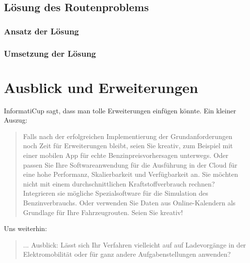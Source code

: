 \documentclass[11pt]{article}
\begin{document}
\subsection{Lösung des Routenproblems}
\subsubsection{Ansatz der Lösung}
\subsubsection{Umsetzung der Lösung}

\section{Ausblick und Erweiterungen}
	InformatiCup sagt, dass man tolle Erweiterungen einfügen könnte. Ein kleiner Auszug: 
	\begin{quote}
		Falls nach der erfolgreichen Implementierung der Grundanforderungen noch Zeit für Erweiterungen bleibt, seien Sie kreativ, zum Beispiel mit einer mobilen App für echte Benzinpreisvorhersagen unterwegs. Oder passen Sie Ihre Softwareanwendung für die Ausführung in der Cloud für eine hohe Performanz, Skalierbarkeit und Verfügbarkeit an. Sie möchten nicht mit einem durchschnittlichen Kraftstoffverbrauch rechnen? Integrieren sie mögliche Spezialsoftware für die Simulation des Benzinverbrauchs. Oder verwenden Sie Daten aus Online-Kalendern als Grundlage für Ihre Fahrzeugrouten. Seien Sie kreativ!
	\end{quote}
	Uns weiterhin:
	\begin{quote}
		... Ausblick: Lässt sich Ihr Verfahren vielleicht auf auf Ladevorgänge in der Elektromobilität oder für ganz andere Aufgabenstellungen anwenden?
	\end{quote}
	
\end{document}
